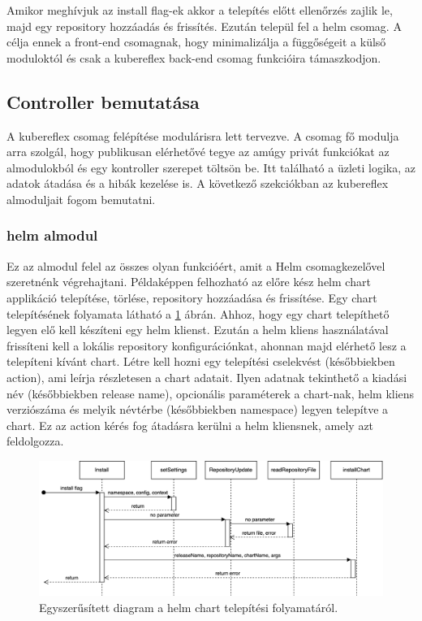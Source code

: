 Amikor meghívjuk az install flag-ek akkor a telepítés előtt ellenőrzés zajlik le, majd egy repository hozzáadás és frissítés.
Ezután települ fel a helm csomag.
A célja ennek a front-end csomagnak, hogy minimalizálja a függőségeit a külső moduloktól és csak a kubereflex back-end csomag funkcióira támaszkodjon.

\subsection{Controller bemutatása}
A kubereflex csomag felépítése modulárisra lett tervezve.
A csomag fő modulja arra szolgál, hogy publikusan elérhetővé tegye az amúgy privát funkciókat az almodulokból és egy kontroller szerepet töltsön be.
Itt található a üzleti logika, az adatok átadása és a hibák kezelése is.
A következő szekciókban az kubereflex almoduljait fogom bemutatni.

\subsubsection*{helm almodul}
Ez az almodul felel az összes olyan funkcióért, amit a Helm csomagkezelővel szeretnénk végrehajtani.
Példaképpen felhozható az előre kész helm chart applikáció telepítése, törlése, repository hozzáadása és frissítése.
Egy chart telepítésének folyamata látható a \ref{helm-simple-sequence} ábrán.
Ahhoz, hogy egy chart telepíthető legyen elő kell készíteni egy helm klienst.
Ezután a helm kliens használatával frissíteni kell a lokális repository konfigurációnkat, ahonnan majd elérhető lesz a telepíteni kívánt chart.
Létre kell hozni egy telepítési cselekvést (későbbiekben action), ami leírja részletesen a chart adatait. Ilyen adatnak tekinthető a kiadási név (későbbiekben release name), opcionális paraméterek a chart-nak, helm kliens verziószáma és melyik névtérbe (későbbiekben namespace) legyen telepítve a chart.
Ez az action kérés fog átadásra kerülni a helm kliensnek, amely azt feldolgozza.

\begin{figure}[ht]
    \centering
         \includegraphics[width=1.0\textwidth]{figures/kli/helm-simple-sequence.png}
          \caption{Egyszerűsített diagram a helm chart telepítési folyamatáról.}
           \label{helm-simple-sequence}
\end{figure}

